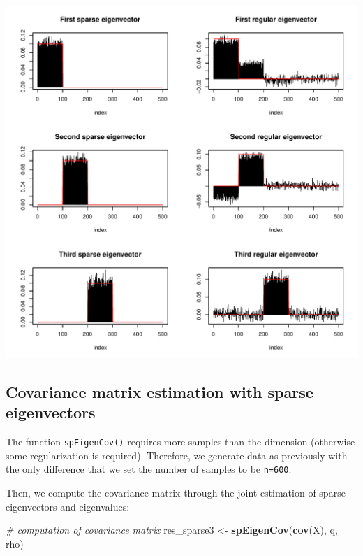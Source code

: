 \documentclass[]{article}
\newenvironment{Shaded}{\begin{snugshade}}{\end{snugshade}}
\newcommand{\KeywordTok}[1]{\textcolor[rgb]{0.13,0.29,0.53}{\textbf{#1}}}
\newcommand{\StringTok}[1]{\textcolor[rgb]{0.31,0.60,0.02}{#1}}
\newcommand{\CommentTok}[1]{\textcolor[rgb]{0.56,0.35,0.01}{\textit{#1}}}
\newcommand{\NormalTok}[1]{#1}
\begin{document}
\begin{center}\includegraphics{SparseEigenvectors_files/figure-latex/unnamed-chunk-7-1} \end{center}

\subsection{Covariance matrix estimation with sparse
eigenvectors}\label{covariance-matrix-estimation-with-sparse-eigenvectors}

The function \texttt{spEigenCov()} requires more samples than the
dimension (otherwise some regularization is required). Therefore, we
generate data as previously with the only difference that we set the
number of samples to be \texttt{n=600}.

Then, we compute the covariance matrix through the joint estimation of
sparse eigenvectors and eigenvalues:

\begin{Shaded}
\begin{Highlighting}[]
\CommentTok{# computation of covariance matrix}
\NormalTok{res_sparse3 <-}\StringTok{ }\KeywordTok{spEigenCov}\NormalTok{(}\KeywordTok{cov}\NormalTok{(X), q, rho)}
\end{Highlighting}
\end{Shaded}
\end{document}
